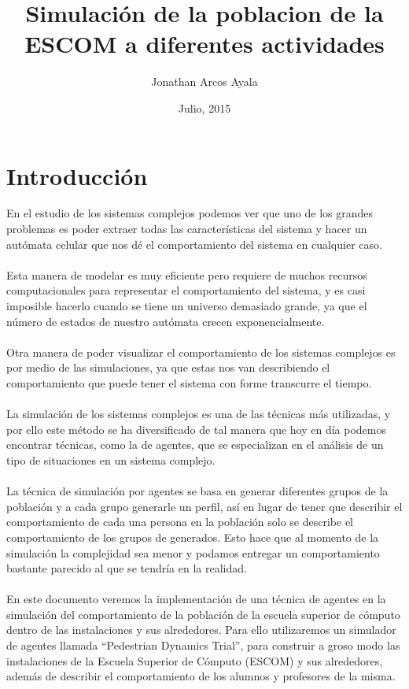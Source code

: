\documentclass[a4paper,10pt]{article}
\title{Simulaci\'on de la poblacion de la ESCOM a diferentes actividades}
\author{Jonathan Arcos Ayala}
\date{Julio, 2015}
\begin{document}
\maketitle

\newpage

\section{Introducci\'on}

En el estudio de los sistemas complejos podemos ver que uno de los grandes problemas es poder extraer todas las caracter\'isticas del sistema y hacer un aut\'omata celular que nos d\'e el comportamiento del sistema en cualquier caso. 
\\ \\
Esta manera de modelar es muy eficiente pero requiere de muchos recursos computacionales para representar el comportamiento del sistema, y es casi imposible hacerlo cuando se tiene un universo demasiado grande, ya que el n\'umero de estados de nuestro aut\'omata crecen exponencialmente.
\\ \\
Otra manera de poder visualizar el comportamiento de los sistemas complejos es por medio de las simulaciones, ya que estas nos van describiendo el comportamiento que puede tener el sistema con forme transcurre el tiempo.
\\ \\
La simulaci\'on de los sistemas complejos es una de las t\'ecnicas m\'as utilizadas, y por ello este m\'etodo se ha diversificado de tal manera que hoy en d\'ia podemos encontrar t\'ecnicas, como la de agentes, que se especializan en el an\'alisis de un tipo de situaciones en un sistema complejo. 
\\ \\
La t\'ecnica de simulaci\'on por agentes se basa en generar diferentes grupos de la poblaci\'on y a cada grupo generarle un perfil, as\'i en lugar de tener que describir el comportamiento de cada una persona en la poblaci\'on solo se describe el comportamiento de los grupos de generados. Esto hace que al momento de la simulaci\'on la complejidad sea menor y podamos entregar un comportamiento bastante parecido al que se tendr\'ia en la realidad.
\\ \\
En este documento veremos la implementaci\'on de una t\'ecnica de agentes en la simulaci\'on del comportamiento de la poblaci\'on de la escuela superior de c\'omputo dentro de las instalaciones y sus alrededores. Para ello utilizaremos un simulador de agentes llamada “Pedestrian Dynamics Trial”, para construir a groso modo las instalaciones de la Escuela Superior de C\'omputo (ESCOM) y sus alrededores, adem\'as de describir el comportamiento de los alumnos y profesores de la misma.
\end{document}
